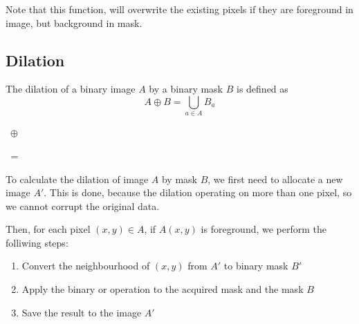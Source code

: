 \documentclass[12pt]{article}
\begin{document}
Note that this function,
will overwrite the existing pixels if they are foreground in image,
but background in mask.

\pagebreak[4]
\subsection{Dilation}

The dilation of a binary image $A$ by a binary mask $B$ is defined as
\begin{equation}
    A \oplus B = \bigcup_{a \in A} B_a
\end{equation}

\begin{center}
    $\; \oplus \; $
    $\; = \; $
\end{center}

To calculate the dilation of image $A$ by mask $B$,
we first need to allocate a new image $A'$.
This is done, because the dilation operating on more than one pixel,
so we cannot corrupt the original data.

Then, for each pixel $(x,y) \in A$, if $A(x,y)$ is foreground,
we perform the folliwing steps:
\begin{enumerate}
    \item Convert the neighbourhood of $(x,y)$ from $A'$ to binary mask $B'$
    \item Apply the binary or operation to the acquired mask and the mask $B$
    \item Save the result to the image $A'$
\end{enumerate}
\end{document}
